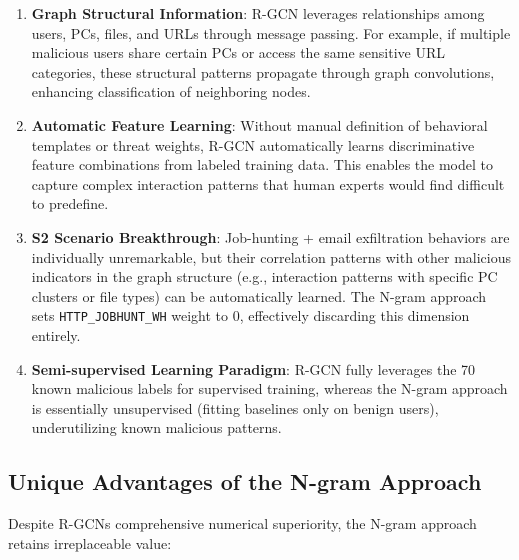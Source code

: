 \documentclass[
  a4paper,
  11pt]{article}
\begin{document}
\begin{enumerate}
\def\labelenumi{\arabic{enumi}.}
\item
  \textbf{Graph Structural Information}: R-GCN leverages relationships
  among users, PCs, files, and URLs through message passing. For
  example, if multiple malicious users share certain PCs or access the
  same sensitive URL categories, these structural patterns propagate
  through graph convolutions, enhancing classification of neighboring
  nodes.
\item
  \textbf{Automatic Feature Learning}: Without manual definition of
  behavioral templates or threat weights, R-GCN automatically learns
  discriminative feature combinations from labeled training data. This
  enables the model to capture complex interaction patterns that human
  experts would find difficult to predefine.
\item
  \textbf{S2 Scenario Breakthrough}: Job-hunting + email exfiltration
  behaviors are individually unremarkable, but their correlation
  patterns with other malicious indicators in the graph structure (e.g.,
  interaction patterns with specific PC clusters or file types) can be
  automatically learned. The N-gram approach sets
  \texttt{HTTP\_JOBHUNT\_WH} weight to 0, effectively discarding this
  dimension entirely.
\item
  \textbf{Semi-supervised Learning Paradigm}: R-GCN fully leverages the
  70 known malicious labels for supervised training, whereas the N-gram
  approach is essentially unsupervised (fitting baselines only on benign
  users), underutilizing known malicious patterns.
\end{enumerate}

\subsection{Unique Advantages of the N-gram
Approach}\label{unique-advantages-of-the-n-gram-approach}

Despite R-GCN\textquotesingle s comprehensive numerical superiority, the
N-gram approach retains irreplaceable value:
\end{document}
